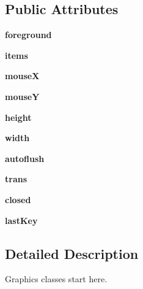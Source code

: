 \subsection*{Public Attributes}
\begin{DoxyCompactItemize}
\item 
\mbox{\label{classgraphics_1_1_graph_win_acd60a861291a9a2a0357422052de423e}} 
{\bfseries foreground}
\item 
\mbox{\label{classgraphics_1_1_graph_win_aa5eb438d0f6bcf9b48cf752bc970492d}} 
{\bfseries items}
\item 
\mbox{\label{classgraphics_1_1_graph_win_a048ee90a088e92ea85449aa4e2dc14e8}} 
{\bfseries mouseX}
\item 
\mbox{\label{classgraphics_1_1_graph_win_a6c44740c795384fad61d1d5a3465d4f5}} 
{\bfseries mouseY}
\item 
\mbox{\label{classgraphics_1_1_graph_win_ac54dcaf8cf4b5d8d4e50ba66636e3804}} 
{\bfseries height}
\item 
\mbox{\label{classgraphics_1_1_graph_win_a8725576095977a7867e61028bf67168a}} 
{\bfseries width}
\item 
\mbox{\label{classgraphics_1_1_graph_win_a678b9a9c46f93e11dc5f76c8503c7888}} 
{\bfseries autoflush}
\item 
\mbox{\label{classgraphics_1_1_graph_win_abceec8568a7d09be0d0461bd32a15225}} 
{\bfseries trans}
\item 
\mbox{\label{classgraphics_1_1_graph_win_aa479363c78ec2ffd05065887abd5851e}} 
{\bfseries closed}
\item 
\mbox{\label{classgraphics_1_1_graph_win_a345868afb0c992bd31b20b02e6593bbb}} 
{\bfseries last\+Key}
\end{DoxyCompactItemize}


\subsection{Detailed Description}
Graphics classes start here. 

